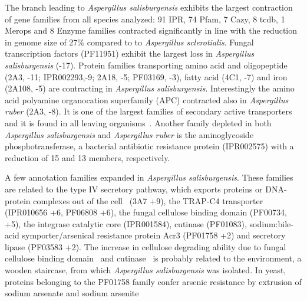 \documentclass[jof,article,submit,moreauthors,pdftex,10pt,a4paper]{Definitions/mdpi}
\newcommand{\aspRub}{\textit{Aspergillus ruber}}
\newcommand{\walIch}{\textit{Wallemia ichthyophaga}}
\newcommand{\phiSp}{\textit{Aspergillus salisburgensis}}
\newcommand{\phiScl}{\textit{Aspergillus sclerotialis}}
\begin{document}
The branch leading to \phiSp{} exhibits the largest contraction of gene families from all species analyzed: 91 IPR, 74 Pfam, 7 Cazy, 8 tcdb, 1 Merops and 8 Enzyme families contracted significantly in line with the reduction in genome size of 27$\%$ compared to to \phiScl{}. Fungal transcription factors (PF11951) exhibit the largest loss in \phiSp{} (-17). Protein families transporting amino acid and oligopeptide (2A3, -11; IPR002293,-9; 2A18, -5; PF03169, -3), fatty acid (4C1, -7) and iron (2A108, -5)  are contracting in \phiSp{}.
Interestingly the amino acid polyamine organocation superfamily (APC) contracted also in \aspRub{} (2A3, -8). It is one of the largest families of secondary active transporters and it is found in all leaving organisms~\cite{Paulsen2000}. Another family depleted in both \phiSp{} and \aspRub{} is the  aminoglycoside phosphotransferase, a bacterial antibiotic resistance protein (IPR002575) with a reduction of 15 and 13 members, respectively. 

A few annotation families expanded in \phiSp{}. These families are related to the type IV secretory pathway, which exports proteins or DNA-protein complexes out of the cell~\cite{Saier2007}  (3A7 +9), the TRAP-C4 transporter (IPR010656 +6, PF06808 +6), the fungal cellulose binding domain (PF00734, +5), the integrase catalytic core (IPR001584), cutinase (PF01083), sodium:bile-acid symporter/arsenical resistance protein Acr3 (PF01758 +2) and secretory lipase (PF03583 +2). The increase in cellulose degrading ability due to fungal cellulose binding domain~\cite{Gilkes1991} and cutinase~\cite{Sweigard1992} is probably related to the environment, a wooden staircase, from which  \phiSp{} was isolated. In yeast, proteins belonging to the PF01758 family confer arsenic resistance by extrusion of sodium arsenate and sodium arsenite~\cite{Fu2009}
\end{document}
